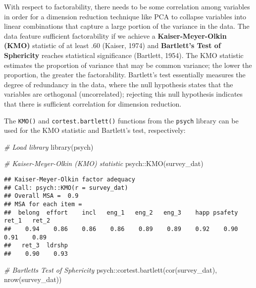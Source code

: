 \documentclass[
]{book}
\newenvironment{Shaded}{\begin{snugshade}}{\end{snugshade}}
\newcommand{\CommentTok}[1]{\textcolor[rgb]{0.56,0.35,0.01}{\textit{#1}}}
\newcommand{\FunctionTok}[1]{\textcolor[rgb]{0.00,0.00,0.00}{#1}}
\newcommand{\NormalTok}[1]{#1}
\newcommand{\SpecialCharTok}[1]{\textcolor[rgb]{0.00,0.00,0.00}{#1}}
\begin{document}
With respect to factorability, there needs to be some correlation among variables in order for a dimension reduction technique like PCA to collapse variables into linear combinations that capture a large portion of the variance in the data. The data feature sufficient factorability if we achieve a \textbf{Kaiser-Meyer-Olkin (KMO)} statistic of at least \(.60\) (Kaiser, 1974) and \textbf{Bartlett's Test of Sphericity} reaches statistical significance (Bartlett, 1954). The KMO statistic estimates the proportion of variance that may be common variance; the lower the proportion, the greater the factorability. Bartlett's test essentially measures the degree of redundancy in the data, where the null hypothesis states that the variables are orthogonal (uncorrelated); rejecting this null hypothesis indicates that there is sufficient correlation for dimension reduction.

The \texttt{KMO()} and \texttt{cortest.bartlett()} functions from the \texttt{psych} library can be used for the KMO statistic and Bartlett's test, respectively:

\begin{Shaded}
\begin{Highlighting}[]
\CommentTok{\# Load library}
\FunctionTok{library}\NormalTok{(psych)}

\CommentTok{\# Kaiser{-}Meyer{-}Olkin (KMO) statistic}
\NormalTok{psych}\SpecialCharTok{::}\FunctionTok{KMO}\NormalTok{(survey\_dat)}
\end{Highlighting}
\end{Shaded}

\begin{verbatim}
## Kaiser-Meyer-Olkin factor adequacy
## Call: psych::KMO(r = survey_dat)
## Overall MSA =  0.9
## MSA for each item = 
##  belong  effort    incl   eng_1   eng_2   eng_3    happ psafety   ret_1   ret_2 
##    0.94    0.86    0.86    0.86    0.89    0.89    0.92    0.90    0.91    0.89 
##   ret_3  ldrshp 
##    0.90    0.93
\end{verbatim}

\begin{Shaded}
\begin{Highlighting}[]
\CommentTok{\# Bartlett\textquotesingle{}s Test of Sphericity}
\NormalTok{psych}\SpecialCharTok{::}\FunctionTok{cortest.bartlett}\NormalTok{(}\FunctionTok{cor}\NormalTok{(survey\_dat), }\FunctionTok{nrow}\NormalTok{(survey\_dat))}
\end{Highlighting}
\end{Shaded}
\end{document}
